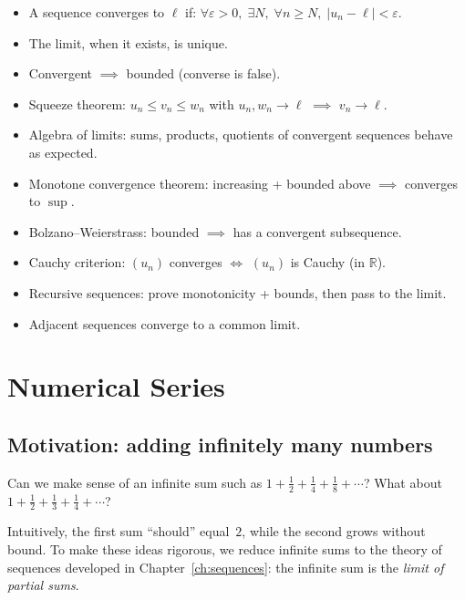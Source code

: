 \documentclass[12pt,a4paper,openany]{book}
\newcommand{\R}{\mathbb{R}}
\newcommand{\eps}{\varepsilon}
\newcommand{\abs}[1]{\left\lvert #1 \right\rvert}
\theoremstyle{definition}
\theoremstyle{remark}
\begin{document}
\begin{tcolorbox}[
   colback=green!3!white,
   colframe=green!50!black,
   title={\textbf{Chapter 3 --- Summary}},
   fonttitle=\bfseries,
   arc=2mm
]
\begin{itemize}
\item A sequence converges to $\ell$ if:
      $\forall \eps > 0,\; \exists N,\; \forall n \geq N,\;
      \abs{u_n - \ell} < \eps$.
\item The limit, when it exists, is unique.
\item Convergent $\implies$ bounded (converse is false).
\item Squeeze theorem: $u_n \leq v_n \leq w_n$ with $u_n, w_n \to \ell$
      $\implies$ $v_n \to \ell$.
\item Algebra of limits: sums, products, quotients of convergent sequences
      behave as expected.
\item Monotone convergence theorem: increasing + bounded above $\implies$
      converges to $\sup$.
\item Bolzano--Weierstrass: bounded $\implies$ has a convergent subsequence.
\item Cauchy criterion: $(u_n)$ converges $\iff$ $(u_n)$ is Cauchy (in $\R$).
\item Recursive sequences: prove monotonicity + bounds, then pass to the
      limit.
\item Adjacent sequences converge to a common limit.
\end{itemize}
\end{tcolorbox}


\chapter{Numerical Series}\label{ch:series}

\section*{Motivation: adding infinitely many numbers}

Can we make sense of an infinite sum such as
$1 + \frac{1}{2} + \frac{1}{4} + \frac{1}{8} + \cdots$?
What about $1 + \frac{1}{2} + \frac{1}{3} + \frac{1}{4} + \cdots$?

Intuitively, the first sum ``should'' equal~$2$, while the second grows
without bound. To make these ideas rigorous, we reduce infinite sums to the
theory of sequences developed in Chapter~\ref{ch:sequences}: the infinite sum
is the \emph{limit of partial sums}.
\end{document}
